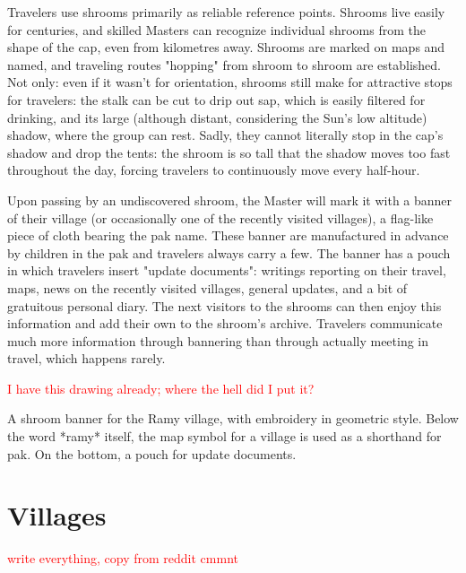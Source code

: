 \documentclass[10pt,oneside]{memoir}
\newcommand{\cmmnt}[1]{\textcolor{red}{#1}}
\begin{document}
Travelers use shrooms primarily as reliable reference points. Shrooms live easily for centuries, and skilled Masters can recognize individual shrooms from the shape of the cap, even from kilometres away. Shrooms are marked on maps and named, and traveling routes "hopping" from shroom to shroom are established. Not only: even if it wasn't for orientation, shrooms still make for attractive stops for travelers: the stalk can be cut to drip out sap, which is easily filtered for drinking, and its large (although distant, considering the Sun's low altitude) shadow, where the group can rest. Sadly, they cannot literally stop in the cap's shadow and drop the tents: the shroom is so tall that the shadow moves too fast throughout the day, forcing travelers to continuously move every half-hour.

Upon passing by an undiscovered shroom, the Master will mark it with a banner of their village (or occasionally one of the recently visited villages), a flag-like piece of cloth bearing the pak name. These banner are manufactured in advance by children in the pak and travelers always carry a few. The banner has a pouch in which travelers insert "update documents": writings reporting on their travel, maps, news on the recently visited villages, general updates, and a bit of gratuitous personal diary. The next visitors to the shrooms can then enjoy this information and add their own to the shroom's archive. Travelers communicate much more information through bannering than through actually meeting in travel, which happens rarely.

\cmmnt{I have this drawing already; where the hell did I put it?}

A shroom banner for the Ramy village, with embroidery in geometric style. Below the word *ramy* itself, the map symbol for a village is used as a shorthand for pak. On the bottom, a pouch for update documents.

\pagebreak

\section{Villages}

\cmmnt{write everything, copy from reddit cmmnt}
\end{document}
